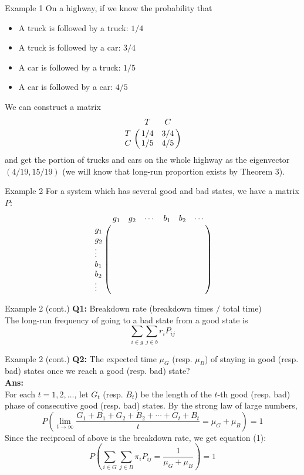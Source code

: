 \documentclass{beamer}
\begin{document}
\begin{frame}{Example 1}
	On a highway, if we know the probability that
	\begin{itemize}
	\item A truck is followed by a truck: $1/4$
	\item A truck is followed by a car: $3/4$
	\item A car is followed by a truck: $1/5$
	\item A car is followed by a car: $4/5$
	\end{itemize}
	We can construct a matrix
	\[
	\bordermatrix{~ & T   & C   \cr
                  T & 1/4 & 3/4 \cr
                  C & 1/5 & 4/5 \cr}
	\]
	and get the portion of trucks and cars on the whole highway as the eigenvector $(4/19, 15/19)$
	(we will know that long-run proportion exists by Theorem 3).
\end{frame}

\begin{frame}{Example 2}
	For a system which has several good and bad states, we have a matrix $P$:
	\[
	\bordermatrix{~      & g_1 & g_2 & \cdots & b_1 & b_2 & \cdots \cr
                  g_1    &     &     &        &     &     &        \cr
                  g_2    &     &     &        &     &     &        \cr
                  \vdots &     &     &        &     &     &        \cr
                  b_1    &     &     &        &     &     &        \cr
                  b_2    &     &     &        &     &     &        \cr
                  \vdots &     &     &        &     &     &        \cr}
	\]
\end{frame}

\begin{frame}{Example 2 (cont.)}
	\textbf{Q1:} Breakdown rate (breakdown times $/$ total time)\\
	The long-run frequency of going to a bad state from a good state is
	\[
	\sum_{i \in g} \sum_{j \in b} r_i P_{ij}
	\]
\end{frame}

\begin{frame}{Example 2 (cont.)}
	\textbf{Q2:} The expected time $\mu_G$ (resp. $\mu_B$) of staying in good (resp. bad) states once we reach a good (resp. bad) state? \\
	\textbf{Ans:} \\
	For each $t = 1, 2, \ldots$, let $G_t$ (resp. $B_t$) be the length of the $t$-th good (resp. bad) phase of consecutive good (resp. bad) states.
	By the strong law of large numbers, 
	\[
	P\left( \lim_{t\to\infty} \frac{G_1 + B_1 + G_2 + B_2 + \cdots + G_t + B_t}{t} = \mu_G + \mu_B \right) = 1
	\]
	Since the reciprocal of above is the breakdown rate, we get equation (1):
	\[
	P\left( \sum_{i \in G} \sum_{j \in B} \pi_i P_{ij} = \frac{1}{\mu_G + \mu_B} \right) = 1
	\]
\end{frame}
\end{document}
